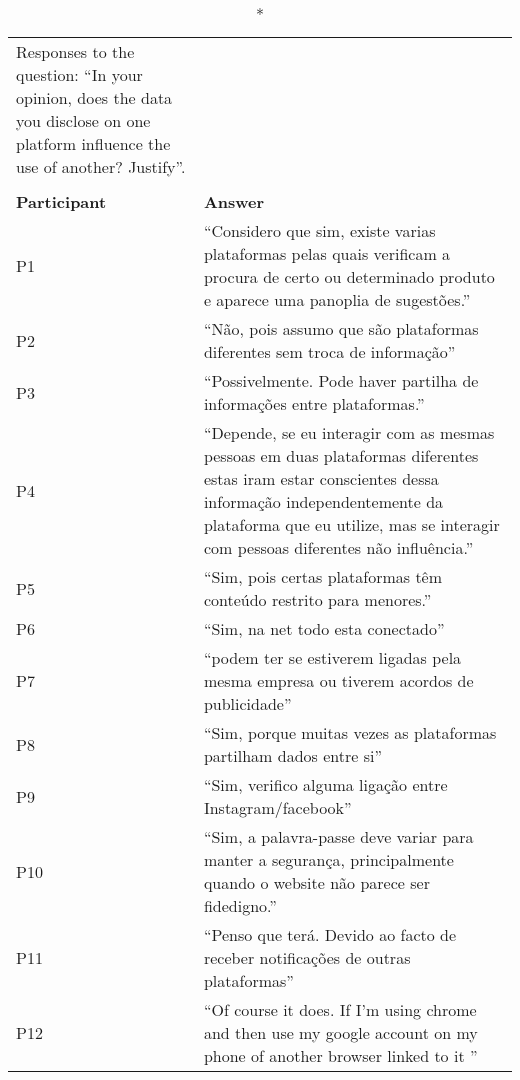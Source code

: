 \begin{table}[H]
    \begin{longtable}{p{3cm} p{13cm}}
        \caption*{Responses to the question: ``In your opinion, does the data you disclose on one platform influence the use of another? Justify''.}\label{table:survey_s5_q8}\\
        \\\hline
        \textbf{Participant} & \textbf{Answer} \\
        \hline
        P1 & ``Considero que sim, existe varias plataformas pelas quais verificam a procura de certo ou determinado produto e aparece uma panoplia de sugestões.'' \\
        \hline
        P2 & ``Não, pois assumo que são plataformas diferentes sem troca de informação'' \\
        \hline
        P3 & ``Possivelmente. Pode haver partilha de informações entre plataformas.'' \\
        \hline
        P4 & ``Depende, se eu interagir com as mesmas pessoas em duas plataformas diferentes estas iram estar conscientes dessa informação independentemente da plataforma que eu utilize, mas se interagir com pessoas diferentes não influência.'' \\
        \hline
        P5 & ``Sim, pois certas plataformas têm conteúdo restrito para menores.'' \\
        \hline
        P6 & ``Sim, na net todo esta conectado'' \\
        \hline
        P7 & ``podem ter se estiverem ligadas pela mesma empresa ou tiverem acordos de publicidade'' \\
        \hline
        P8 & ``Sim, porque muitas vezes as plataformas partilham dados entre si'' \\
        \hline
        P9 & ``Sim, verifico alguma ligação entre Instagram/facebook'' \\
        \hline
        P10 & ``Sim, a palavra-passe deve variar para manter a segurança, principalmente quando o website não parece ser fidedigno.'' \\
        \hline
        P11 & ``Penso que terá. Devido ao facto de receber notificações de outras plataformas'' \\
        \hline
        P12 & ``Of course it does. If I'm using chrome and then use my google account on my phone of another browser linked to it '' \\

\end{longtable}
\end{table}
